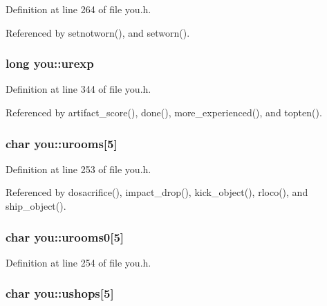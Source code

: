 Definition at line 264 of file you.\+h.



Referenced by setnotworn(), and setworn().

\hypertarget{structyou_ac096bd7eef66e6d79962d6e9848071df}{
\subsubsection[{urexp}]{\setlength{\rightskip}{0pt plus 5cm}long you\+::urexp}}\label{structyou_ac096bd7eef66e6d79962d6e9848071df}


Definition at line 344 of file you.\+h.



Referenced by artifact\+\_\+score(), done(), more\+\_\+experienced(), and topten().

\hypertarget{structyou_a3a44bd4651bae48019fe01f96afc457a}{
\subsubsection[{urooms}]{\setlength{\rightskip}{0pt plus 5cm}char you\+::urooms\mbox{[}5\mbox{]}}}\label{structyou_a3a44bd4651bae48019fe01f96afc457a}


Definition at line 253 of file you.\+h.



Referenced by dosacrifice(), impact\+\_\+drop(), kick\+\_\+object(), rloco(), and ship\+\_\+object().

\hypertarget{structyou_ad096000dbf05d6d67c149dac6213ff6b}{
\subsubsection[{urooms0}]{\setlength{\rightskip}{0pt plus 5cm}char you\+::urooms0\mbox{[}5\mbox{]}}}\label{structyou_ad096000dbf05d6d67c149dac6213ff6b}


Definition at line 254 of file you.\+h.

\hypertarget{structyou_a1bc3b5ca1e5d9957ab3a7f451c069f47}{
\subsubsection[{ushops}]{\setlength{\rightskip}{0pt plus 5cm}char you\+::ushops\mbox{[}5\mbox{]}}}\label{structyou_a1bc3b5ca1e5d9957ab3a7f451c069f47}


